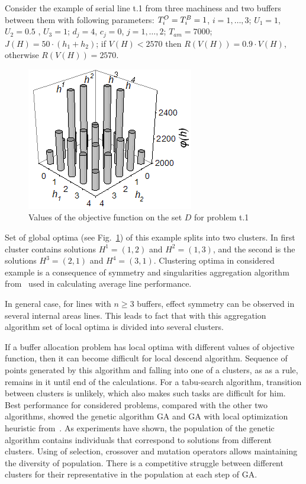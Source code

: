 \documentclass{ifacconf}
\begin{document}
Consider the example of serial line t.1 from
three machiness and two buffers between them with following parameters: ${T^{\rm O}_i=T^{\rm B}_i=1}$, $i = 1,\ldots,3$;
 ${U_1=1}$, ${U_2=0.5}$ , ${U_3=1}$;
 ${d_j=4}$, ${c_j=0}$, $j = 1,\ldots,2$;
 $T_{am}=7000$;
 $J(H)=50\cdot(h_1+h_2)$;
 if $V(H) < 2570$ then $R(V(H))=0.9\cdot V(H)$, otherwise $R(V(H))=2570$.

 \begin{figure}[h!]
	\centering
	\includegraphics[scale=0.9]{test}
  \caption{Values of the objective function on the set $D$ for problem t.1\label{t_1}}
  \end{figure}

Set of global optima (see Fig.~\ref{t_1}) of this example splits into two clusters. In
first cluster contains solutions $H^1=(1,2)$ and $H^2=(1,3)$, and
the second is the solutions $H^3=(2,1)$ and $H^4=(3,1)$. Clustering optima in
considered example is a consequence of symmetry and singularities
aggregation algorithm from~\cite{Dolgui93} used in calculating average
line performance.

In general case, for lines with $n\geq 3$ buffers, effect
symmetry can be observed in several internal areas
lines. This leads to fact that with this aggregation algorithm
set of local optima is divided into several clusters.

If a buffer allocation problem has local
optima with different values of
objective 
function,
then it can become
difficult for local descend algorithm.
Sequence of points
generated by this algorithm and falling into one of a clusters, as
as a rule, remains in it until end of the calculations. For a tabu-search algorithm, transition between clusters is unlikely, which also makes
such tasks are difficult for him. Best performance for
considered problems, compared with the other two algorithms,
showed the genetic algorithm GA and GA with local optimization heuristic from~\cite{sHBBA2007}. 
As experiments have shown, the population of the genetic algorithm contains individuals that correspond to solutions from different clusters. 
Using of selection, crossover and mutation operators allows maintaining the diversity of population.
There is a competitive struggle between different clusters for their representative in the population at each step of GA.
\end{document}
